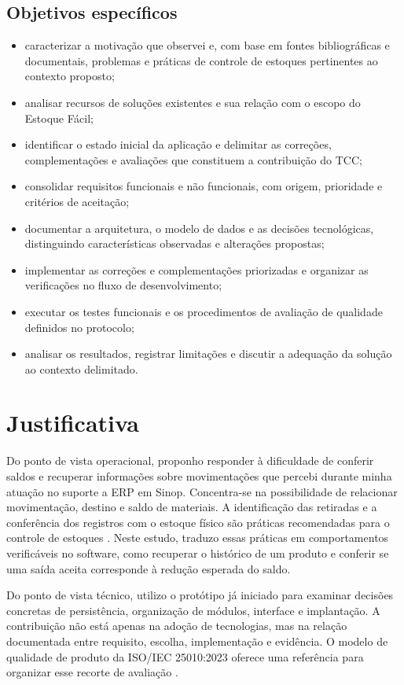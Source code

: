 \subsection{Objetivos específicos}
\begin{itemize}
    \item caracterizar a motivação que observei e, com base em fontes bibliográficas e documentais, problemas e práticas de controle de estoques pertinentes ao contexto proposto;
    \item analisar recursos de soluções existentes e sua relação com o escopo do Estoque Fácil;
    \item identificar o estado inicial da aplicação e delimitar as correções, complementações e avaliações que constituem a contribuição do TCC;
    \item consolidar requisitos funcionais e não funcionais, com origem, prioridade e critérios de aceitação;
    \item documentar a arquitetura, o modelo de dados e as decisões tecnológicas, distinguindo características observadas e alterações propostas;
    \item implementar as correções e complementações priorizadas e organizar as verificações no fluxo de desenvolvimento;
    \item executar os testes funcionais e os procedimentos de avaliação de qualidade definidos no protocolo;
    \item analisar os resultados, registrar limitações e discutir a adequação da solução ao contexto delimitado.
\end{itemize}

\section{Justificativa}

Do ponto de vista operacional, proponho responder à dificuldade de conferir saldos e recuperar informações sobre movimentações que percebi durante minha atuação no suporte a ERP em Sinop. Concentra-se na possibilidade de relacionar movimentação, destino e saldo de materiais. A identificação das retiradas e a conferência dos registros com o estoque físico são práticas recomendadas para o controle de estoques \cite{SebraeControle2026}. Neste estudo, traduzo essas práticas em comportamentos verificáveis no software, como recuperar o histórico de um produto e conferir se uma saída aceita corresponde à redução esperada do saldo.

Do ponto de vista técnico, utilizo o protótipo já iniciado para examinar decisões concretas de persistência, organização de módulos, interface e implantação. A contribuição não está apenas na adoção de tecnologias, mas na relação documentada entre requisito, escolha, implementação e evidência. O modelo de qualidade de produto da ISO/IEC 25010:2023 oferece uma referência para organizar esse recorte de avaliação \cite{ISO25010_2023}.

